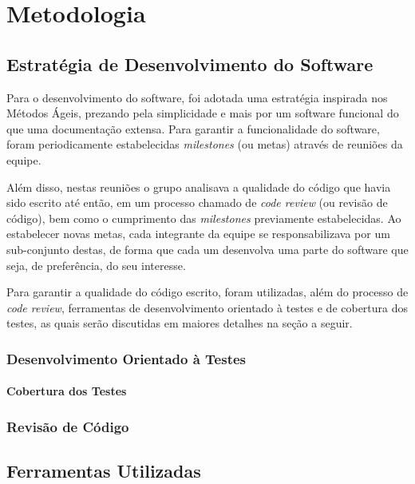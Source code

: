 
\chapter{Metodologia}

\section{Estratégia de Desenvolvimento do Software}

Para o desenvolvimento do software, foi adotada uma estratégia inspirada nos Métodos Ágeis, prezando pela simplicidade e mais por um software funcional do que uma documentação extensa.
Para garantir a funcionalidade do software, foram periodicamente estabelecidas \emph{milestones} (ou metas) através de reuniões da equipe.

Além disso, nestas reuniões o grupo analisava a qualidade do código que havia sido escrito até então, em um processo chamado de \emph{code review} (ou revisão de código), bem como o cumprimento das \emph{milestones} previamente estabelecidas.
Ao estabelecer novas metas, cada integrante da equipe se responsabilizava por um sub-conjunto destas, de forma que cada um desenvolva uma parte do software que seja, de preferência, do seu interesse.

Para garantir a qualidade do código escrito, foram utilizadas, além do processo de \emph{code review}, ferramentas de desenvolvimento orientado à testes e de cobertura dos testes, as quais serão discutidas em maiores detalhes na seção a seguir.

\subsection{Desenvolvimento Orientado à Testes}

\subsubsection{Cobertura dos Testes}

\subsection{Revisão de Código}

\section{Ferramentas Utilizadas}

